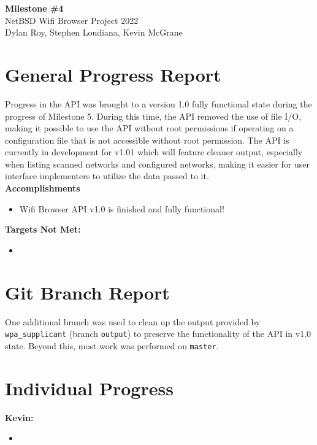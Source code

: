 \documentclass[11pt]{article}
\begin{document}
\begin{center}
  \textbf{\Large Milestone \#4}\\\large NetBSD Wifi Browser Project 2022\\
  Dylan Roy, Stephen Loudiana, Kevin McGrane
\end{center}


\section{General Progress Report}
Progress in the API was brought to a version 1.0 fully functional state during
the progress of Milestone 5. During this time, the API removed the use of file
I/O, making it possible to use the API without root permissions if operating on
a configuration file that is not accessible without root permission. The API is
currently in development for v1.01 which will feature cleaner output, especially
when listing scanned networks and configured networks, making it easier for user
interface implementers to utilize the data passed to it.\\

\textbf{Accomplishments}
\begin{itemize}
  \item Wifi Browser API v1.0 is finished and fully functional!
\end{itemize}

\textbf{Targets Not Met:}
\begin{itemize}
  \item
\end{itemize}


\section{Git Branch Report}
One additional branch was used to clean up the output provided by \texttt{wpa\_supplicant}
(branch \texttt{output}) to preserve the functionality of the API in v1.0 state.
Beyond this, most work was performed on \texttt{master}.

\section{Individual Progress}

\textbf{Kevin:}
\begin{itemize}
  \item
\end{itemize}
\end{document}
